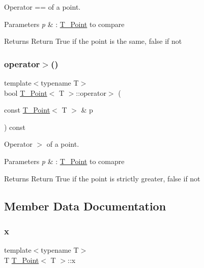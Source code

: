 Operator == of a point. 


\begin{DoxyParams}{Parameters}
{\em p} & \+: \hyperlink{classPoint}{T_Point} to compare \\
\hline
\end{DoxyParams}
\begin{DoxyReturn}{Returns}
Return True if the point is the same, false if not 
\end{DoxyReturn}
\mbox{\label{classPoint_acc5ef36d8fd82f6034ec4764f7c7cbf8}} 
\subsubsection{\texorpdfstring{operator$>$()}{operator>()}}
{\footnotesize\ttfamily template$<$typename T$>$ \\
bool \hyperlink{classPoint}{T_Point}$<$ T $>$\+::operator$>$ (\begin{DoxyParamCaption}\item[{const \hyperlink{classPoint}{T_Point}$<$ T $>$ \&}]{p }\end{DoxyParamCaption}) const\hspace{0.3cm}{\ttfamily [inline]}}



Operator $>$ of a point. 


\begin{DoxyParams}{Parameters}
{\em p} & \+: \hyperlink{classPoint}{T_Point} to comapre \\
\hline
\end{DoxyParams}
\begin{DoxyReturn}{Returns}
Return True if the point is strictly greater, false if not 
\end{DoxyReturn}


\subsection{Member Data Documentation}
\mbox{\label{classPoint_a401d07562afaf0079121218025e66b76}} 
\subsubsection{\texorpdfstring{x}{x}}
{\footnotesize\ttfamily template$<$typename T$>$ \\
T \hyperlink{classPoint}{T_Point}$<$ T $>$\+::x}

